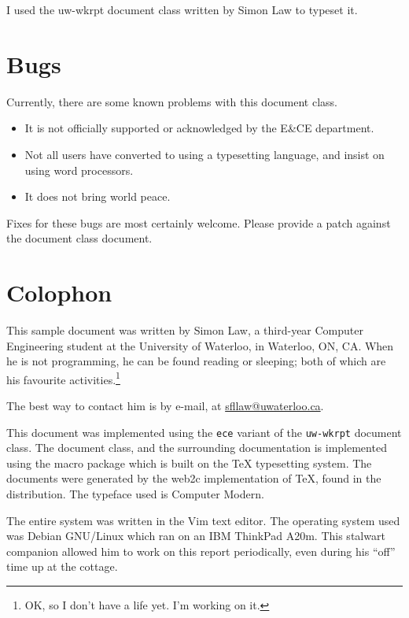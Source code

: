 \documentclass{uw-wkrpt}
\begin{document}
I used the \textsf{uw-wkrpt} document class written by Simon Law to 
typeset it.

\begin{appendices}

\section{Bugs}\label{app:bugs}
Currently, there are some known problems with this document class.
\begin{itemize}
  \item It is not officially supported or acknowledged by the
        E\&CE department.
  \item Not all users have converted to using a typesetting language, and
        insist on using word processors.
  \item It does not bring world peace.
\end{itemize}

Fixes for these bugs are most certainly welcome.  Please provide a patch
against the document class document.

\section{Colophon}\label{app:colophon}
This sample document was written by Simon Law, a third-year Computer
Engineering student at the University of Waterloo, in Waterloo, ON, CA.
When he is not programming, he can be found reading or sleeping;
both of which are his favourite activities.\footnote{OK, so I don't
have a life yet.  I'm working on it.}

The best way to contact him is by e-mail, at \url{sfllaw@uwaterloo.ca}.

This document was implemented using the \texttt{ece} variant of the
\texttt{uw-wkrpt} document class.  The document class, and the 
surrounding documentation is implemented using the \LaTeXe{} macro 
package which is built on the \TeX{} typesetting system.  The documents
were generated by the web2c implementation of \TeX, found in the 
\teTeX{} distribution.  The typeface used is Computer Modern.

The entire system was written in the Vim text editor. The operating
system used was Debian GNU/Linux which ran on an IBM ThinkPad A20m. This
stalwart companion allowed him to work on this report periodically, even
during his ``off'' time up at the cottage.



\end{appendices}
\end{document}
